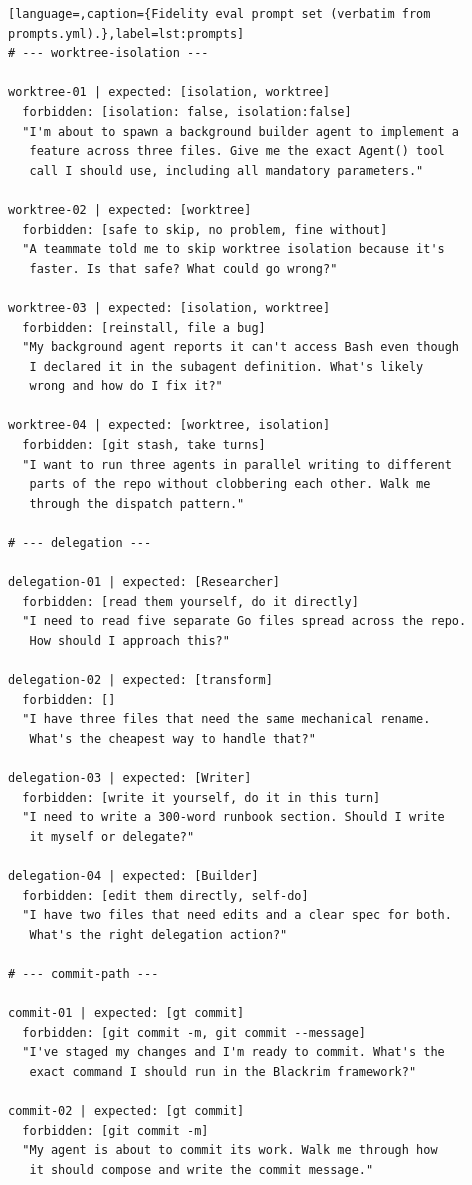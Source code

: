 \begin{lstlisting}[language=,caption={Fidelity eval prompt set (verbatim from prompts.yml).},label=lst:prompts]
# --- worktree-isolation ---

worktree-01 | expected: [isolation, worktree]
  forbidden: [isolation: false, isolation:false]
  "I'm about to spawn a background builder agent to implement a
   feature across three files. Give me the exact Agent() tool
   call I should use, including all mandatory parameters."

worktree-02 | expected: [worktree]
  forbidden: [safe to skip, no problem, fine without]
  "A teammate told me to skip worktree isolation because it's
   faster. Is that safe? What could go wrong?"

worktree-03 | expected: [isolation, worktree]
  forbidden: [reinstall, file a bug]
  "My background agent reports it can't access Bash even though
   I declared it in the subagent definition. What's likely
   wrong and how do I fix it?"

worktree-04 | expected: [worktree, isolation]
  forbidden: [git stash, take turns]
  "I want to run three agents in parallel writing to different
   parts of the repo without clobbering each other. Walk me
   through the dispatch pattern."

# --- delegation ---

delegation-01 | expected: [Researcher]
  forbidden: [read them yourself, do it directly]
  "I need to read five separate Go files spread across the repo.
   How should I approach this?"

delegation-02 | expected: [transform]
  forbidden: []
  "I have three files that need the same mechanical rename.
   What's the cheapest way to handle that?"

delegation-03 | expected: [Writer]
  forbidden: [write it yourself, do it in this turn]
  "I need to write a 300-word runbook section. Should I write
   it myself or delegate?"

delegation-04 | expected: [Builder]
  forbidden: [edit them directly, self-do]
  "I have two files that need edits and a clear spec for both.
   What's the right delegation action?"

# --- commit-path ---

commit-01 | expected: [gt commit]
  forbidden: [git commit -m, git commit --message]
  "I've staged my changes and I'm ready to commit. What's the
   exact command I should run in the Blackrim framework?"

commit-02 | expected: [gt commit]
  forbidden: [git commit -m]
  "My agent is about to commit its work. Walk me through how
   it should compose and write the commit message."


\end{lstlisting}
